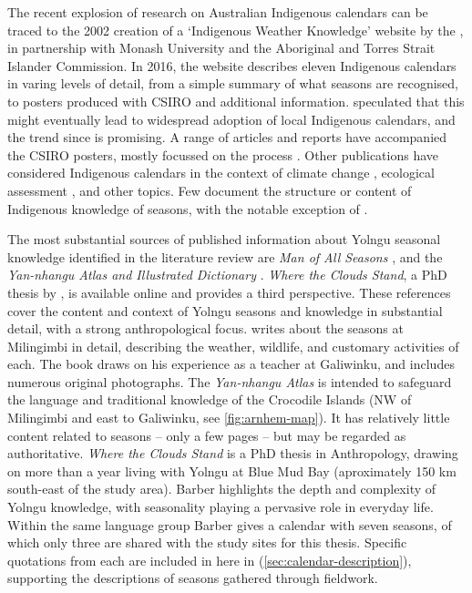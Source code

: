 The recent explosion of research on Australian Indigenous calendars can be
traced to the 2002 creation of a `Indigenous Weather Knowledge' website by the
\citet{BOM-iwk}, in partnership with Monash University and the Aboriginal and
Torres Strait Islander Commission.  In 2016, the website describes eleven
Indigenous calendars in varing levels of detail, from a simple summary of what
seasons are recognised, to posters produced with CSIRO and additional
information.  \citet{kingsley2003} speculated that this might eventually lead
to widespread adoption of local Indigenous calendars, and the trend since is promising.
%
A range of articles and reports have accompanied the CSIRO posters, mostly
focussed on the process \citep[eg.][]{woodward2010,oconnor2010}.  Other
publications have considered Indigenous calendars in the context of
climate change \citep[eg.][]{green2010a,green2010b},
ecological assessment \citep[eg.][]{ens2012,prober2011}, and other topics.
Few document the structure or content of Indigenous knowledge of seasons, with
the notable exception of \citet[eg.][]{woodward2012b}.


The most substantial sources of published information about Yolngu seasonal
knowledge identified in the literature review are \textit{Man of All Seasons}
\citep{davis1989}, and the \textit{Yan-nhangu Atlas and Illustrated Dictionary}
\citep{atlas2014}.  \textit{Where the Clouds Stand}, a PhD thesis by
\citep{barber2005}, is available online and provides a third perspective.
These references cover the content and context of Yolngu seasons and knowledge
in substantial detail, with a strong anthropological focus.
%
\citet{davis1989} writes about the seasons at Milingimbi in detail,
describing the weather, wildlife, and customary activities of each.  The book
draws on his experience as a teacher at Galiwinku, and includes
numerous original photographs.
%
The \textit{Yan-nhangu Atlas} is intended to safeguard the language and
traditional knowledge of the Crocodile Islands (NW of Milingimbi and east
to Galiwinku, see \cref{fig:arnhem-map}).  It has relatively little content
related to seasons -- only a few pages -- but may be regarded as authoritative.
%
\textit{Where the Clouds Stand} is a PhD thesis in Anthropology, drawing on
more than a year living with Yolngu at Blue Mud Bay (aproximately 150 km
south-east of the study area).  Barber highlights the depth and complexity
of Yolngu knowledge, with seasonality playing a pervasive role in everyday
life.  Within the same language group Barber gives a calendar with
seven seasons, of which only three are shared with the study sites for this
thesis.
%
Specific quotations from each are included in here in \textit{}
(\cref{sec:calendar-description}), supporting the descriptions of seasons
gathered through fieldwork.

